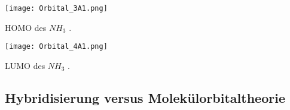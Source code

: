 \begin{dsafigure}
	\centering
	\texttt{[image: Orbital\_3A1.png]}
	\caption{HOMO des $NH_3$ \cite{ADF2017authors}.}
	\label{homo}
\end{dsafigure}

\begin{dsafigure}
	\centering
	\texttt{[image: Orbital\_4A1.png]}
	\caption{LUMO des $NH_3$ \cite{ADF2017authors}.}
	\label{lumo}
\end{dsafigure}

\subsection{Hybridisierung versus Molekülorbitaltheorie}


